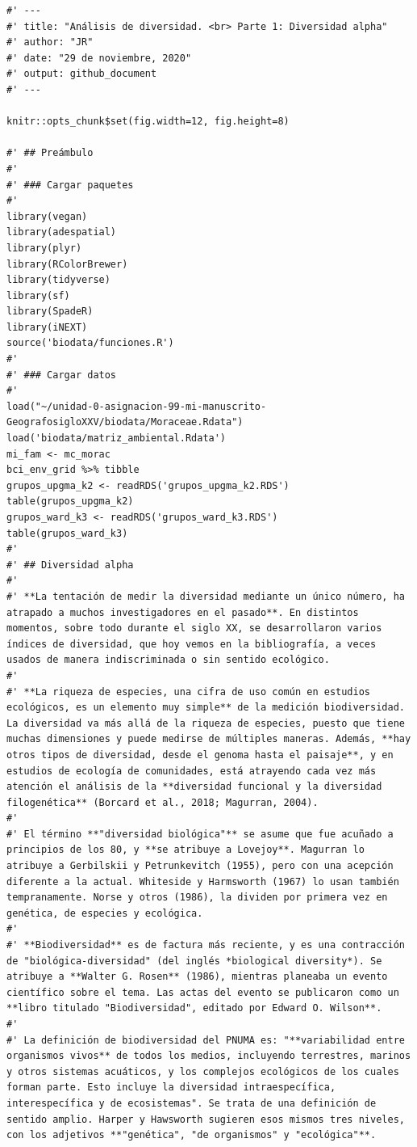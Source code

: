 \documentclass[11pt,]{article}
\begin{document}
\begin{verbatim}
#' ---
#' title: "Análisis de diversidad. <br> Parte 1: Diversidad alpha"
#' author: "JR"
#' date: "29 de noviembre, 2020"
#' output: github_document
#' ---

knitr::opts_chunk$set(fig.width=12, fig.height=8)

#' ## Preámbulo
#' 
#' ### Cargar paquetes
#' 
library(vegan)
library(adespatial)
library(plyr)
library(RColorBrewer)
library(tidyverse)
library(sf)
library(SpadeR)
library(iNEXT)
source('biodata/funciones.R')
#' 
#' ### Cargar datos
#' 
load("~/unidad-0-asignacion-99-mi-manuscrito-GeografosigloXXV/biodata/Moraceae.Rdata")
load('biodata/matriz_ambiental.Rdata')
mi_fam <- mc_morac
bci_env_grid %>% tibble
grupos_upgma_k2 <- readRDS('grupos_upgma_k2.RDS')
table(grupos_upgma_k2)
grupos_ward_k3 <- readRDS('grupos_ward_k3.RDS')
table(grupos_ward_k3)
#' 
#' ## Diversidad alpha
#' 
#' **La tentación de medir la diversidad mediante un único número, ha atrapado a muchos investigadores en el pasado**. En distintos momentos, sobre todo durante el siglo XX, se desarrollaron varios índices de diversidad, que hoy vemos en la bibliografía, a veces usados de manera indiscriminada o sin sentido ecológico.
#' 
#' **La riqueza de especies, una cifra de uso común en estudios ecológicos, es un elemento muy simple** de la medición biodiversidad. La diversidad va más allá de la riqueza de especies, puesto que tiene muchas dimensiones y puede medirse de múltiples maneras. Además, **hay otros tipos de diversidad, desde el genoma hasta el paisaje**, y en estudios de ecología de comunidades, está atrayendo cada vez más atención el análisis de la **diversidad funcional y la diversidad filogenética** (Borcard et al., 2018; Magurran, 2004).
#' 
#' El término **"diversidad biológica"** se asume que fue acuñado a principios de los 80, y **se atribuye a Lovejoy**. Magurran lo atribuye a Gerbilskii y Petrunkevitch (1955), pero con una acepción diferente a la actual. Whiteside y Harmsworth (1967) lo usan también tempranamente. Norse y otros (1986), la dividen por primera vez en genética, de especies y ecológica.
#' 
#' **Biodiversidad** es de factura más reciente, y es una contracción de "biológica-diversidad" (del inglés *biological diversity*). Se atribuye a **Walter G. Rosen** (1986), mientras planeaba un evento científico sobre el tema. Las actas del evento se publicaron como un **libro titulado "Biodiversidad", editado por Edward O. Wilson**.
#' 
#' La definición de biodiversidad del PNUMA es: "**variabilidad entre organismos vivos** de todos los medios, incluyendo terrestres, marinos y otros sistemas acuáticos, y los complejos ecológicos de los cuales forman parte. Esto incluye la diversidad intraespecífica, interespecífica y de ecosistemas". Se trata de una definición de sentido amplio. Harper y Hawsworth sugieren esos mismos tres niveles, con los adjetivos **"genética", "de organismos" y "ecológica"**.

\end{verbatim}
\end{document}

